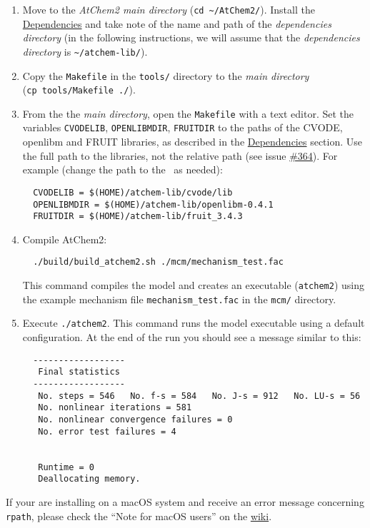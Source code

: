 \begin{enumerate}
\item Move to the \emph{AtChem2 main directory} (\texttt{cd\
    \textasciitilde{}/AtChem2/}). Install the
  \hyperref[sec:dependencies]{Dependencies} and take note of the name
  and path of the \emph{dependencies directory} (in the following
  instructions, we will assume that the \emph{dependencies directory}
  is \texttt{\textasciitilde{}/atchem-lib/}).
\item Copy the \texttt{Makefile} in the \texttt{tools/} directory to
  the \emph{main directory} (\texttt{cp\ tools/Makefile\ ./}).
\item From the the \emph{main directory}, open the \texttt{Makefile}
  with a text editor. Set the variables \texttt{CVODELIB},
  \texttt{OPENLIBMDIR}, \texttt{FRUITDIR} to the paths of the CVODE,
  openlibm and FRUIT libraries, as described in the
  \hyperref[sec:dependencies]{Dependencies} section. Use the full path
  to the libraries, not the relative path (see issue
  \href{https://github.com/AtChem/AtChem2/issues/364}{\#364}). For
  example (change the path to the \depdir\ as needed):
  \begin{verbatim}
  CVODELIB = $(HOME)/atchem-lib/cvode/lib
  OPENLIBMDIR = $(HOME)/atchem-lib/openlibm-0.4.1
  FRUITDIR = $(HOME)/atchem-lib/fruit_3.4.3
  \end{verbatim}
\item Compile AtChem2:
  \begin{verbatim}
  ./build/build_atchem2.sh ./mcm/mechanism_test.fac
  \end{verbatim}
  This command compiles the model and creates an executable
  (\texttt{atchem2}) using the example mechanism file
  \texttt{mechanism\_test.fac} in the \texttt{mcm/} directory.
\item Execute \verb|./atchem2|. This command runs the model executable
  using a default configuration. At the end of the run you should see
  a message similar to this:
  \begin{verbatim}
  ------------------
   Final statistics
  ------------------
   No. steps = 546   No. f-s = 584   No. J-s = 912   No. LU-s = 56
   No. nonlinear iterations = 581
   No. nonlinear convergence failures = 0
   No. error test failures = 4


   Runtime = 0
   Deallocating memory.
  \end{verbatim}
\end{enumerate}

If your are installing on a macOS system and receive an error message
concerning \texttt{rpath}, please check the ``Note for macOS users'' on
the \href{https://github.com/AtChem/AtChem2/wiki/How-to-install-AtChem2}{wiki}.

